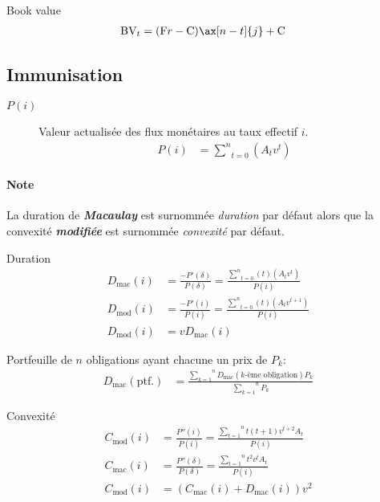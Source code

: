 \documentclass[10pt, french]{article}
\begin{document}
\begin{multicols*}{2}
Book value
\begin{align*}
	\text{BV}_{t}
		&=	(\text{F}r - \text{C}) \ax[n - t]{j} + \text{C}
\end{align*}

\columnbreak

\subsection*{Immunisation}

\begin{description}
	\item[$P(i)$]	Valeur actualisée des flux monétaires au taux effectif $i$.
		\begin{align*}
		P(i)	
		&=	\underset{t = 0}{\overset{n}{\sum}} (A_{t}v^{t})
		\end{align*}
\end{description}

\paragraph{Note}	La duration de \textit{\textbf{Macaulay}} est surnommée \og \textit{duration} \fg{} par défaut alors que la convexité \textit{\textbf{modifiée}} est surnommée \og \textit{convexité} \fg{} par défaut.

\begin{rappel}{Duration}
\begin{align*}
	D_{\text{mac}}(i)
	&=	\frac{-P'(\delta)}{P(\delta)}
	=	\frac{\underset{t = 0}{\overset{n}{\sum}} (t) (A_{t}v^{t})}{P(i)}	\\
	D_{\text{mod}}(i)
	&=	\frac{-P'(i)}{P(i)}	
	=	\frac{\underset{t = 0}{\overset{n}{\sum}} (t) (A_{t}v^{t + 1})}{P(i)}	\\
	D_{\text{mod}}(i)
	&=	vD_{\text{mac}}(i)
\end{align*}

\tcbline

Portfeuille de $n$ obligations ayant chacune un prix de $P_k$:
\begin{align*}
	D_{\text{mac}}(\text{ptf.}) 
	&=	\frac{\overset{n}{\underset{k = 1}{\sum}} D_{\text{mac}}(\text{$k$-ème obligation}) P_{k}}{\overset{n}{\underset{k = 1}{\sum}} P_{k}}
\end{align*}
\end{rappel}

\begin{rappel}{Convexité}
\begin{align*}
	C_{\text{mod}}(i)
	&=	\frac{P''(i)}{P(i)}
	=	\frac{\overset{n}{\underset{t = 1}{\sum}} t (t + 1) v^{t + 2} A_{t}}{P(i)}	\\
	C_{\text{mac}}(i)
	&=	\frac{P''(\delta)}{P(\delta)}
	=	\frac{\overset{n}{\underset{t = 1}{\sum}} t^{2} v^{t} A_{t}}{P(i)}	\\
	C_{\text{mod}}(i)
	&=	(C_{\text{mac}}(i) + D_{\text{mac}}(i))v^{2}
\end{align*}
\end{rappel}


\end{multicols*}
\end{document}
